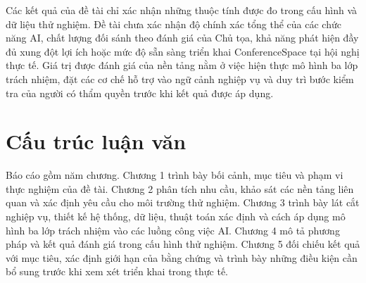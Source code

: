 Các kết quả của đề tài chỉ xác nhận những thuộc tính được đo trong cấu hình và dữ liệu thử nghiệm. Đề tài chưa xác nhận độ chính xác tổng thể của các chức năng AI, chất lượng đối sánh theo đánh giá của Chủ tọa, khả năng phát hiện đầy đủ xung đột lợi ích hoặc mức độ sẵn sàng triển khai ConferenceSpace tại hội nghị thực tế. Giá trị được đánh giá của nền tảng nằm ở việc hiện thực mô hình ba lớp trách nhiệm, đặt các cơ chế hỗ trợ vào ngữ cảnh nghiệp vụ và duy trì bước kiểm tra của người có thẩm quyền trước khi kết quả được áp dụng.

\section{Cấu trúc luận văn}

Báo cáo gồm năm chương. Chương 1 trình bày bối cảnh, mục tiêu và phạm vi thực nghiệm của đề tài. Chương 2 phân tích nhu cầu, khảo sát các nền tảng liên quan và xác định yêu cầu cho môi trường thử nghiệm. Chương 3 trình bày lát cắt nghiệp vụ, thiết kế hệ thống, dữ liệu, thuật toán xác định và cách áp dụng mô hình ba lớp trách nhiệm vào các luồng công việc AI. Chương 4 mô tả phương pháp và kết quả đánh giá trong cấu hình thử nghiệm. Chương 5 đối chiếu kết quả với mục tiêu, xác định giới hạn của bằng chứng và trình bày những điều kiện cần bổ sung trước khi xem xét triển khai trong thực tế.

